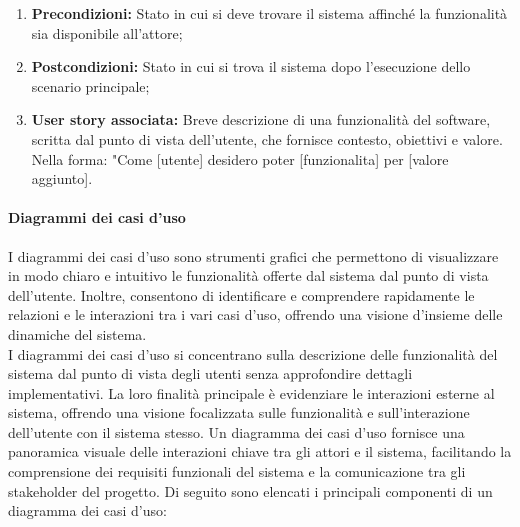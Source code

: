 \begin{enumerate}
    \item \textbf{Precondizioni:} Stato in cui si deve trovare il sistema affinché la funzionalità sia disponibile all'attore;
    \item \textbf{Postcondizioni:} Stato in cui si trova il sistema dopo l'esecuzione dello scenario principale;
    \item \textbf{User story associata:} Breve descrizione di una funzionalità del software, scritta dal punto di vista dell'utente, che fornisce contesto, obiettivi e valore. \\
    Nella forma: "Come [utente] desidero poter [funzionalita] per [valore aggiunto].
\end{enumerate}

\paragraph{Diagrammi dei casi d'uso} 
I diagrammi dei casi d'uso sono strumenti grafici che permettono di visualizzare in modo chiaro e intuitivo le funzionalità offerte dal sistema dal punto di vista dell'utente. Inoltre, consentono di identificare e comprendere rapidamente le relazioni e le interazioni tra i vari casi d'uso, offrendo una visione d'insieme delle dinamiche del sistema.\\
I diagrammi dei casi d'uso si concentrano sulla descrizione delle funzionalità del sistema dal punto di vista degli utenti senza approfondire dettagli implementativi. La loro finalità principale è evidenziare le interazioni esterne al sistema, offrendo una visione focalizzata sulle funzionalità e sull'interazione dell'utente con il sistema stesso.
Un diagramma dei casi d'uso fornisce una panoramica visuale delle interazioni chiave tra gli attori e il sistema, facilitando la comprensione dei requisiti funzionali del sistema e la comunicazione tra gli stakeholder del progetto.
Di seguito sono elencati i principali componenti di un diagramma dei casi d'uso:

